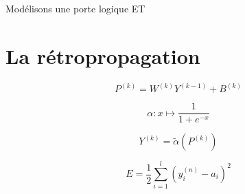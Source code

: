 \documentclass[ignorenonframetext,]{beamer}
\begin{document}
\begin{frame}{Modélisons une porte logique ET}


\end{frame}

\section{La rétropropagation}
\frame{\sectionpage}
\begin{frame}{}

\[ P^{(k)} = W^{(k)}Y^{(k-1)}+B^{(k)}  \]

\[ \alpha : x \mapsto \frac{1}{1+e^{-x}} \]

\[ Y^{(k)} = \tilde\alpha(P^{(k)}) \]

\[ E = \frac{1}{2} \sum_{i=1}^l (y_i^{(n)}-a_i)^2 \]

\end{frame}
\end{document}
